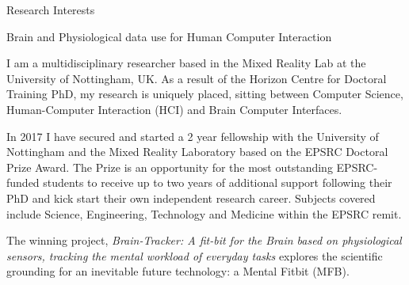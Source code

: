 \documentclass{resume} %
\begin{document}
\begin{rSection}{Research Interests}
\begin{rSubsection}{Brain and Physiological data use for Human Computer Interaction}{ }{ }{ }
\vspace{-5 mm}

I am a multidisciplinary researcher based in the Mixed Reality Lab at the University of Nottingham, UK. As a result of the Horizon Centre for Doctoral Training PhD, my research is uniquely placed, sitting between Computer Science, Human-Computer Interaction (HCI) and Brain Computer Interfaces. 

In 2017 I have secured and started a 2 year fellowship with the University of Nottingham and the Mixed Reality Laboratory based on the EPSRC Doctoral Prize Award. The Prize is an opportunity for the most outstanding EPSRC-funded students to receive up to two years of additional support following their PhD and kick start their own independent research career. Subjects covered include Science, Engineering, Technology and Medicine within the EPSRC remit.

 The winning project, \textit{Brain-Tracker: A fit-bit for the Brain based on physiological sensors, tracking the mental workload of everyday tasks} explores the scientific grounding for an inevitable future technology: a Mental Fitbit (MFB).



\end{rSubsection}
\end{rSection}
\end{document}
